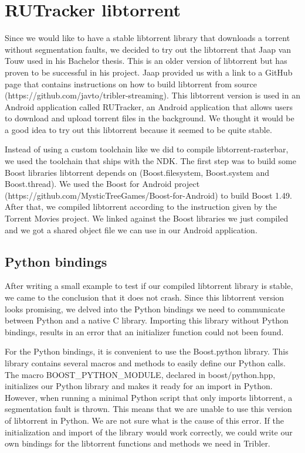 	\section{RUTracker libtorrent}
		Since we would like to have a stable libtorrent library that downloads a torrent without segmentation faults, we decided to try out the libtorrent that Jaap van Touw used in his Bachelor thesis. This is an older version of libtorrent but has proven to be successful in his project. Jaap provided us with a link to a GitHub page that contains instructions on how to build libtorrent from source (https://github.com/javto/tribler-streaming). This libtorrent version is used in an Android application called RUTracker, an Android application that allows users to download and upload torrent files in the background. We thought it would be a good idea to try out this libtorrent because it seemed to be quite stable.
		
		Instead of using a custom toolchain like we did to compile libtorrent-rasterbar, we used the toolchain that ships with the NDK. The first step was to build some Boost libraries libtorrent depends on (Boost.filesystem, Boost.system and Boost.thread). We used the Boost for Android project (https://github.com/MysticTreeGames/Boost-for-Android) to build Boost 1.49. After that, we compiled libtorrent according to the instruction given by the Torrent Movies project. We linked against the Boost libraries we just compiled and we got a shared object file we can use in our Android application.
		
		\subsection{Python bindings}
			After writing a small example to test if our compiled libtorrent library is stable, we came to the conclusion that it does not crash. Since this libtorrent version looks promising, we delved into the Python bindings we need to communicate between Python and a native C library. Importing this library without Python bindings, results in an error that an initializer function could not been found.
		
			For the Python bindings, it is convenient to use the Boost.python library. This library contains several macros and methods to easily define our Python calls. The macro \newline BOOST\_PYTHON\_MODULE, declared in boost/python.hpp, initializes our Python library and makes it ready for an import in Python. However, when running a minimal Python script that only imports libtorrent, a segmentation fault is thrown. This means that we are unable to use this version of libtorrent in Python. We are not sure what is the cause of this error. If the initialization and import of the library would work correctly, we could write our own bindings for the libtorrent functions and methods we need in Tribler.
			
